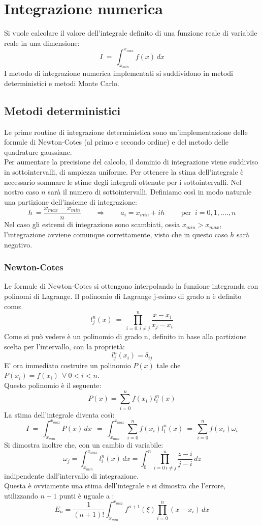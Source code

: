


\tableofcontents
\chapter{Integrazione numerica}
Si vuole calcolare il valore dell'integrale definito di una funzione reale di variabile reale in una dimensione:
$$
 	I \ = \ \int_{x_{min}}^{x_{max}} f(x) \, dx
$$
I metodo di integrazione numerica implementati si suddividono in metodi deterministici e  metodi Monte Carlo.
\section{Metodi deterministici}
Le prime routine di integrazione deterministica sono un'implementazione delle formule di Newton-Cotes (al primo e secondo ordine) e del metodo delle quadrature gaussiane.\\
Per aumentare la precisione del calcolo, il dominio di integrazione viene suddiviso in sottointervalli, di ampiezza uniforme.
Per ottenere la stima dell'integrale è necessario sommare le stime degli integrali ottenute per i sottointervalli.
Nel nostro caso $n$ sarà il numero di sottointervalli. Definiamo così in modo naturale una partizione dell'insieme di integrazione:
$$
	h \ = \frac{x_{max} - x_{min}}{ n} \qquad \Longrightarrow \qquad a_i = x_{min} + i h  \qquad
	\mbox{ per } \ i = 0,1,....,n 
$$
Nel caso gli estremi di integrazione sono scambiati, ossia $x_{min} > x_{max}$, l'integrazione avviene comunque correttamente,
visto che in questo caso $h$ sarà negativo.
\subsection{Newton-Cotes}
Le formule di Newton-Cotes si ottengono interpolando la funzione integranda con polinomi di Lagrange.
Il polinomio di Lagrange j-esimo di grado n è definito come:
$$
	l_j^n (x)\ = \ \prod_{i = 0, i \ne j}^{n} \frac{x-x_i}{x_j - x_i}
$$
	Come si può vedere è un polinomio di grado n, definito in base alla partizione scelta per l'intervallo, con la proprietà:
$$
	l_j^n ( x_i) = \delta_{ij}
$$
E' ora immediato costruire un polinomio $P(x)$ tale che $ P(x_i) = f(x_i) \ \ \forall \   0<i<n$.\\
Questo polinomio è il seguente:
$$
	P(x) = \sum_{i = 0}^n f(x_i) l_i^n(x)
$$
La stima dell'integrale diventa così:
$$
 I \ = \ \int_{x_{min}}^{x_{max}} P(x) \, dx \ \ = \ \int_{x_{min}}^{x_{max}} \sum_{i = 0}^n f(x_i) l_i^n(x)  \ =  \ \sum_{i = 0}^n f(x_i) \omega_i 
$$
 Si dimostra inoltre che, con un cambio di variabile:
 $$
 \omega_j = \int_{x_{min}}^{x_{max}} l_i^n(x) \,dx  = \int_{0}^{n} \prod_{i = 0 \ i \ne j}^n \frac{z-i}{j-i}\,dz 
$$
indipendente dall'intervallo di integrazione.\\
Questa è ovviamente una stima dell'integrale e si dimostra che l'errore, utilizzando $n+1$ punti è uguale a :
$$
 E_n = \frac{1}{(n+1)!} \int_{x_{min}}^{x_{max}} f^{n+1}(\xi) \prod_{i = 0}^n {(x-x_i)} \, dx 
 $$

